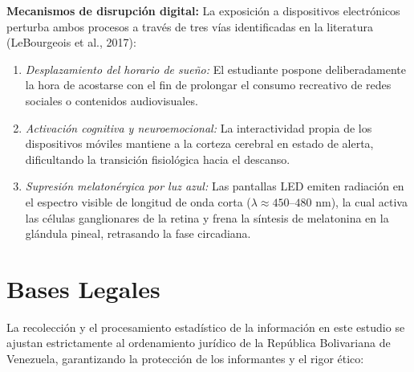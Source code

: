 \documentclass[12pt, letterpaper]{article}
\begin{document}
\textbf{Mecanismos de disrupción digital:} La exposición a dispositivos electrónicos perturba ambos procesos a través de tres vías identificadas en la literatura (LeBourgeois et al., 2017):
\begin{enumerate}[label=(\alph*)]
    \item \textit{Desplazamiento del horario de sueño:} El estudiante pospone deliberadamente la hora de acostarse con el fin de prolongar el consumo recreativo de redes sociales o contenidos audiovisuales.
    \item \textit{Activación cognitiva y neuroemocional:} La interactividad propia de los dispositivos móviles mantiene a la corteza cerebral en estado de alerta, dificultando la transición fisiológica hacia el descanso.
    \item \textit{Supresión melatonérgica por luz azul:} Las pantallas LED emiten radiación en el espectro visible de longitud de onda corta ($\lambda \approx 450\text{--}480\text{ nm}$), la cual activa las células ganglionares de la retina y frena la síntesis de melatonina en la glándula pineal, retrasando la fase circadiana.
\end{enumerate}


\section{Bases Legales}

La recolección y el procesamiento estadístico de la información en este estudio se ajustan estrictamente al ordenamiento jurídico de la República Bolivariana de Venezuela, garantizando la protección de los informantes y el rigor ético:
\end{document}
